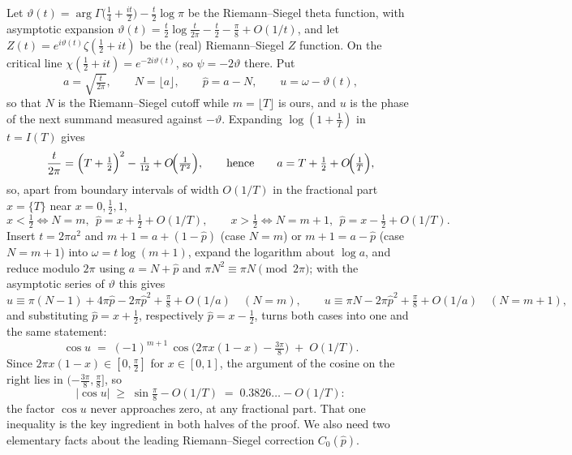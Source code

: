 \documentclass[11pt]{article}
\theoremstyle{definition}
\begin{document}
Let $\vartheta(t)=\arg\Gamma\bigl(\tfrac14+\tfrac{it}2\bigr)
-\tfrac t2\log\pi$ be the Riemann--Siegel theta function, with asymptotic
expansion $\vartheta(t)=\tfrac t2\log\tfrac t{2\pi}-\tfrac t2-\tfrac\pi8
+O(1/t)$, and let $Z(t)=e^{i\vartheta(t)}\zeta(\tfrac12+it)$ be the (real)
Riemann--Siegel $Z$ function. On the critical line
$\chi(\tfrac12+it)=e^{-2i\vartheta(t)}$, so $\psi=-2\vartheta$ there. Put
\begin{equation}
a=\sqrt{\tfrac t{2\pi}},\qquad N=\lfloor a\rfloor,\qquad \hat p=a-N,
\qquad u=\omega-\vartheta(t),
\end{equation}
so that $N$ is the Riemann--Siegel cutoff while $m=\lfloor T\rfloor$ is
ours, and $u$ is the phase of the next summand measured against
$-\vartheta$. Expanding $\log(1+\tfrac1T)$ in $t=I(T)$ gives
\begin{equation}\label{eq:a-vs-T}
\frac{t}{2\pi}=\Bigl(T+\tfrac12\Bigr)^{2}-\tfrac1{12}+O\!\Bigl(\tfrac1{T^{2}}\Bigr),
\qquad\text{hence}\qquad
a=T+\tfrac12+O\!\Bigl(\tfrac1{T}\Bigr),
\end{equation}
so, apart from boundary intervals of width $O(1/T)$ in the fractional part
$x=\{T\}$ near $x=0,\tfrac12,1$,
\begin{equation}\label{eq:cut-cases}
x<\tfrac12 \iff N=m,\ \ \hat p=x+\tfrac12+O(1/T),
\qquad
x>\tfrac12 \iff N=m+1,\ \ \hat p=x-\tfrac12+O(1/T).
\end{equation}
Insert $t=2\pi a^{2}$ and $m+1=a+(1-\hat p)$ (case $N=m$) or
$m+1=a-\hat p$ (case $N=m+1$) into $\omega=t\log(m+1)$, expand the
logarithm about $\log a$, and reduce modulo $2\pi$ using $a=N+\hat p$ and
$\pi N^{2}\equiv\pi N \pmod{2\pi}$; with the asymptotic series of
$\vartheta$ this gives
\[
u\equiv\pi(N-1)+4\pi\hat p-2\pi\hat p^{2}+\tfrac\pi8+O(1/a)
\quad(N=m),
\qquad
u\equiv\pi N-2\pi\hat p^{2}+\tfrac\pi8+O(1/a)
\quad(N=m+1),
\]
and substituting $\hat p=x+\tfrac12$, respectively $\hat p=x-\tfrac12$,
turns both cases into one and the same statement:
\begin{equation}\label{eq:cosu}
\cos u \;=\;(-1)^{m+1}\,
\cos\!\bigl(2\pi x(1-x)-\tfrac{3\pi}8\bigr)\;+\;O(1/T).
\end{equation}
Since $2\pi x(1-x)\in[0,\tfrac\pi2]$ for $x\in[0,1]$, the argument of the
cosine on the right lies in $(-\tfrac{3\pi}8,\tfrac\pi8]$, so
\begin{equation}\label{eq:cosu-bound}
|\cos u|\;\geq\;\sin\tfrac\pi8-O(1/T)\;=\;0.3826\ldots-O(1/T):
\end{equation}
the factor $\cos u$ never approaches zero, at any fractional part. That one
inequality is the key ingredient in both halves of the proof. We also need two
elementary facts about the leading Riemann--Siegel correction
$C_0(\hat p)$.
\end{document}
